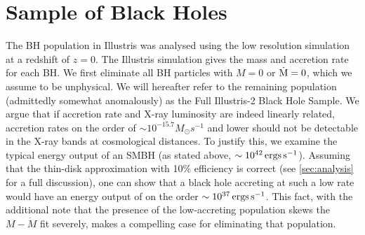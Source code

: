 \section{Sample of Black Holes}

\label{sec:sample}The BH population in Illustris was analysed using 
the low resolution simulation at a redshift of $z=0$. The Illustris 
simulation gives the mass and accretion rate for each BH. We first 
eliminate all BH particles with $M=0$ or $\dot{{\rm M}}=0$, which 
we assume to be unphysical. We will hereafter refer to the remaining 
population (admittedly somewhat anomalously) as the Full Illustris-2 
Black Hole Sample. We argue that if accretion rate and X-ray luminosity 
are indeed linearly related, accretion rates on the order of 
$\sim10^{-15.7}M_{\odot}s^{-1}$ and lower should not be detectable in 
the X-ray bands at cosmological distances. To justify this, we examine 
the typical energy output of an SMBH (as stated above, 
$\sim10^{42}\,{\rm ergs}\,{\rm s^{-1}}$). Assuming that the thin-disk
approximation with 10\% efficiency is correct (see \ref{sec:analysis}
for a full discussion), one can show that a black hole accreting at 
such a low rate would have an energy output of on the order 
$\sim10^{37}\,{\rm ergs}\,{\rm s^{-1}}$. This fact, with the 
additional note that the presence of the low-accreting population 
skews the $M-\dot{M}$ fit severely, makes a compelling case for
eliminating that population.

